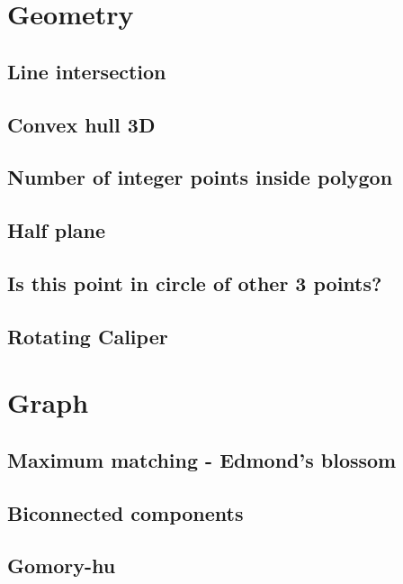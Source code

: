 \section{Geometry}
\subsection{Line intersection}
\raggedbottom
\hrulefill
\subsection{Convex hull 3D}
\raggedbottom
\hrulefill
\subsection{Number of integer points inside polygon}
\raggedbottom
\hrulefill
\subsection{Half plane}
\raggedbottom
\hrulefill
\subsection{Is this point in circle of other 3 points?}
\raggedbottom
\hrulefill
\subsection{Rotating Caliper}
\raggedbottom
\hrulefill

\section{Graph}
\subsection{Maximum matching - Edmond's blossom}
\raggedbottom
\hrulefill
\subsection{Biconnected components}
\raggedbottom
\hrulefill
\subsection{Gomory-hu}
\raggedbottom
\hrulefill
